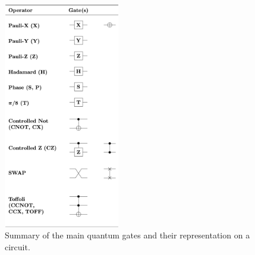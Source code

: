 \begin{itemize}
\end{itemize}
\begin{figure}[ht]
  \centering
  \includegraphics[width=0.45\textwidth]{figures/Quantum_Logic_Gates.png}
  \caption{Summary of the main quantum gates and their representation on a circuit.}
\end{figure}

